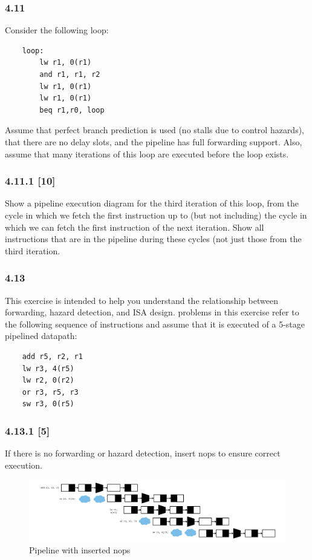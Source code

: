 \documentclass[fleqn]{article}
\begin{document}
\subsubsection*{4.11} Consider the following loop:
\begin{lstlisting}
    loop:
        lw r1, 0(r1)
        and r1, r1, r2
        lw r1, 0(r1)
        lw r1, 0(r1)
        beq r1,r0, loop
\end{lstlisting}
Assume that perfect branch prediction is used (no stalls due to control hazards), that there are no delay slots,
and the pipeline has full forwarding support. Also, assume that many iterations of this loop are executed
before the loop exists.


\subsubsection*{4.11.1 [10] \textrangle} Show a pipeline execution diagram for the third iteration of this loop, from the cycle in which we
fetch the first instruction up to (but not including) the cycle in which we can fetch the first instruction of
the next iteration. Show all instructions that are in the pipeline during these cycles (not just those from the
third iteration.
\vspace{0.125in}

\subsubsection*{4.13} This exercise is intended to help you understand the relationship between forwarding, hazard detection,
and ISA design. problems in this exercise refer to the following sequence of instructions and assume that it
is executed of a 5-stage pipelined datapath:
\begin{lstlisting}
    add r5, r2, r1
    lw r3, 4(r5)
    lw r2, 0(r2)
    or r3, r5, r3
    sw r3, 0(r5)
\end{lstlisting}


\subsubsection*{4.13.1 [5] \textrangle} If there is no forwarding or hazard detection, insert nops to ensure correct execution.
\begin{figure}[H]
    \centering
    \includegraphics[width=6.5in]{p4_13_1.png}
    \caption{Pipeline with inserted nops}
\end{figure}
\end{document}

